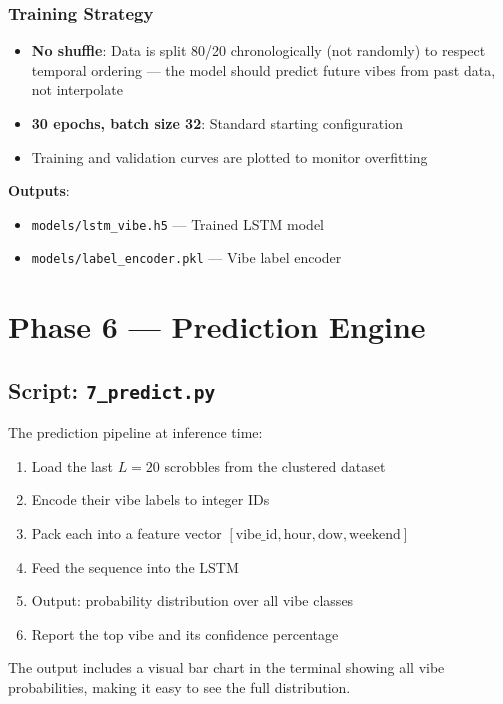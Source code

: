 \documentclass[12pt, a4paper]{article}
\begin{document}
\subsubsection{Training Strategy}
\begin{itemize}
    \item \textbf{No shuffle}: Data is split 80/20 chronologically (not randomly) to respect temporal ordering — the model should predict future vibes from past data, not interpolate
    \item \textbf{30 epochs, batch size 32}: Standard starting configuration
    \item Training and validation curves are plotted to monitor overfitting
\end{itemize}

\textbf{Outputs}:
\begin{itemize}
    \item \texttt{models/lstm\_vibe.h5} — Trained LSTM model
    \item \texttt{models/label\_encoder.pkl} — Vibe label encoder
\end{itemize}

\section{Phase 6 — Prediction Engine}

\subsection{Script: \texttt{7\_predict.py}}

The prediction pipeline at inference time:

\begin{enumerate}
    \item Load the last $L=20$ scrobbles from the clustered dataset
    \item Encode their vibe labels to integer IDs
    \item Pack each into a feature vector $[\text{vibe\_id}, \text{hour}, \text{dow}, \text{weekend}]$
    \item Feed the sequence into the LSTM
    \item Output: probability distribution over all vibe classes
    \item Report the top vibe and its confidence percentage
\end{enumerate}

The output includes a visual bar chart in the terminal showing all vibe probabilities, making it easy to see the full distribution.
\end{document}
